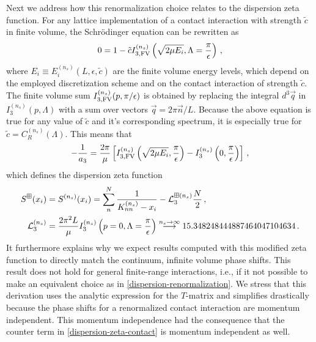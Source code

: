 Next we address how this renormalization choice relates to the dispersion zeta function.
For any lattice implementation of a contact interaction with strength $\tilde c$ in finite volume, the Schrödinger equation can be rewritten as
\begin{equation}
	0 = 1 - \tilde c I_{3, \textrm{FV}}^{(n_s)}\left(\sqrt{2 \mu E_i}, \Lambda = \frac{\pi}{\epsilon}\right) \, ,
\end{equation}
where $E_i \equiv E_i^{(n_s)}(L, \epsilon, \tilde c)$ are the finite volume energy levels, which depend on the employed discretization scheme and on the contact interaction of strength $\tilde c$.
The finite volume sum $I_{3, \textrm{FV}}^{(n_s)}(p, \pi/\epsilon)$ is obtained by replacing the integral $d^3 \vec q$ in $I_3^{(n_s)}(p, \Lambda)$ with a sum  over vectors $\vec q = 2 \pi \vec n / L$.
Because the above equation is true for any value of $\tilde c$ and it's corresponding spectrum, it is especially true for $\tilde c = C_R^{(n_s)}(\Lambda)$.
This means that
\begin{equation}
	- \frac{1}{a_3}
	=
	\frac{2 \pi}{\mu}
		\left[
		I_{3, \textrm{FV}}^{(n_s)}\left(\sqrt{2 \mu E_i}, \frac{\pi}{\epsilon}\right)
		- I_3^{(n_s)}\left(0, \frac{\pi}{\epsilon}\right)
		\right]
	\, ,
\end{equation}
which defines the dispersion zeta function
\begin{align}\label{eq:dispersion-zeta-contact}
	S^{\boxplus}(x_i)
	&=
	S^{(n_s)}(x_i)
	=
	\sum\limits_n^N
	\frac{1}{K_{nn}^{(n_s)} - x_i} - \mathcal{L}_3^{\boxplus (n_s)} \frac{N}{2}
	\, ,
	\\
	\mathcal{L}_3^{(n_s)}
	&=
	\frac{2 \pi^2 L}{\mu}
	I_3^{(n_s)}\left(p=0, \Lambda = \frac{\pi}{\epsilon}\right)
	\overset{n_s \to \infty}{\longrightarrow}
	15.348248444887464047104634
	\, .
\end{align}
It furthermore explains why we expect results computed with this modified zeta function to directly match the continuum, infinite volume phase shifts.
This result does not hold for general finite-range interactions, i.e., if it not possible to make an equivalent choice as in \eqref{dispersion-renormalization}.
We stress that this derivation uses the analytic  expression for the $T$-matrix and simplifies drastically because the phase shifts for a renormalized contact interaction are momentum independent.
This momentum independence had the consequence that the counter term in \eqref{dispersion-zeta-contact} is momentum independent as well.


